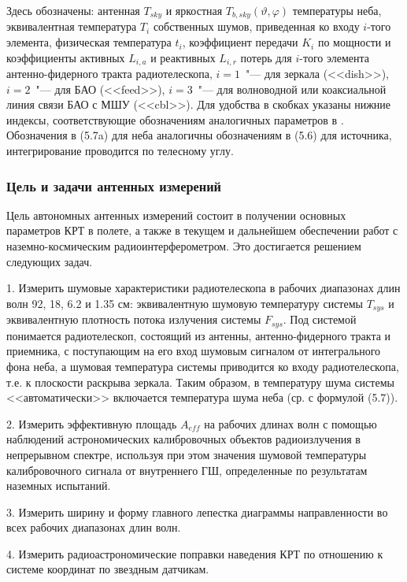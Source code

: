 \noindent
Здесь обозначены: антенная $T_{sky}$ и яркостная  $T_{b,sky} (\vartheta, \varphi)$ температуры неба,
эквивалентная температура $T_i$ собственных шумов, приведенная ко входу $i$-того элемента,
физическая температура $t_i$, коэффициент передачи $K_i$ по мощности и коэффициенты активных
$L_{i,a}$ и реактивных $L_{i,r}$ потерь для $i$-того элемента антенно-фидерного тракта
радиотелескопа, $i = 1$~"--- для зеркала (<<dish>>), $i = 2$~"--- для БАО (<<feed>>), $i = 3$~"---
для волноводной или коаксиальной линия связи БАО с МШУ (<<cbl>>). Для удобства в скобках указаны
нижние индексы, соответствующие обозначениям аналогичных параметров в \cite{RAUH}. Обозначения в
(5.7a) для неба аналогичны обозначениям в (5.6) для источника, интегрирование проводится по
телесному углу.

\subsubsection{Цель и задачи антенных измерений}

Цель автономных антенных измерений состоит в получении основных параметров КРТ в полете, а также в
текущем и дальнейшем обеспечении работ с наземно-космическим радиоинтерферометром. Это достигается
решением следующих задач.

1. Измерить шумовые характеристики радиотелескопа в рабочих диапазонах
длин волн 92, 18, 6.2 и 1.35 см: эквивалентную шумовую температуру системы
$T_{sys}$ и эквивалентную плотность потока излучения системы $F_{sys}$.
Под системой понимается радиотелескоп, состоящий из антенны, антенно-фидерного тракта и
приемника, с поступающим на его вход шумовым сигналом от интегрального фона неба,
а шумовая температура системы приводится ко входу радиотелескопа, т.е. к плоскости
раскрыва зеркала. Таким образом, в температуру шума системы <<автоматически>>
включается температура шума неба (ср. с формулой (5.7)).

2. Измерить эффективную площадь $A_{eff}$ на рабочих длинах волн с помощью
наблюдений астрономических калибровочных объектов радиоизлучения в непрерывном
спектре, используя при этом значения шумовой температуры
калибровочного сигнала от внутреннего ГШ,
определенные по результатам наземных испытаний.

3. Измерить ширину и форму главного лепестка диаграммы направленности
во всех рабочих диапазонах длин волн.

4. Измерить радиоастрономические поправки наведения КРТ по отношению к
системе координат по звездным датчикам.



